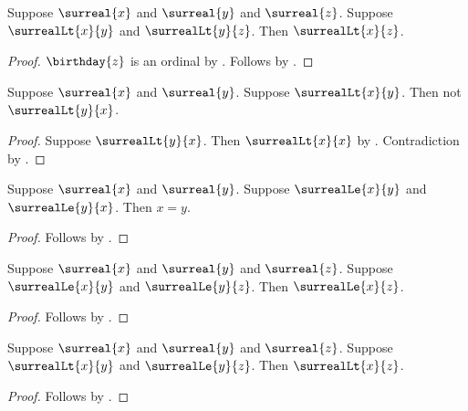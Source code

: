 \begin{theorem}\label{surreal_lt_transitive}
    Suppose $\surreal{x}$ and $\surreal{y}$ and $\surreal{z}$.
    Suppose $\surrealLt{x}{y}$ and $\surrealLt{y}{z}$.
    Then $\surrealLt{x}{z}$.
\end{theorem}
\begin{proof}
    $\birthday{z}$ is an ordinal
        by .
    Follows by
        .
\end{proof}

\begin{corollary}\label{surreal_lt_asymmetric}
    Suppose $\surreal{x}$ and $\surreal{y}$.
    Suppose $\surrealLt{x}{y}$.
    Then not $\surrealLt{y}{x}$.
\end{corollary}
\begin{proof}
    Suppose $\surrealLt{y}{x}$.
    Then $\surrealLt{x}{x}$ by .
    Contradiction by .
\end{proof}

\begin{theorem}\label{surreal_le_antisymmetric}
    Suppose $\surreal{x}$ and $\surreal{y}$.
    Suppose $\surrealLe{x}{y}$ and $\surrealLe{y}{x}$.
    Then $x=y$.
\end{theorem}
\begin{proof}
    Follows by .
\end{proof}

\begin{theorem}\label{surreal_le_transitive}
    Suppose $\surreal{x}$ and $\surreal{y}$ and $\surreal{z}$.
    Suppose $\surrealLe{x}{y}$ and $\surrealLe{y}{z}$.
    Then $\surrealLe{x}{z}$.
\end{theorem}
\begin{proof}
    Follows by .
\end{proof}

\begin{corollary}\label{surreal_lt_le_transitive}
    Suppose $\surreal{x}$ and $\surreal{y}$ and $\surreal{z}$.
    Suppose $\surrealLt{x}{y}$ and $\surrealLe{y}{z}$.
    Then $\surrealLt{x}{z}$.
\end{corollary}
\begin{proof}
    Follows by .
\end{proof}

